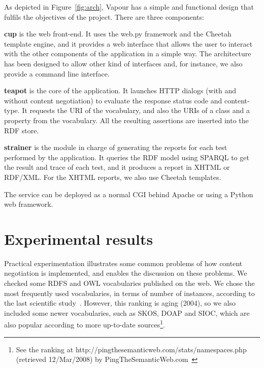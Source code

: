 \documentclass{../templates/llncs}
\begin{document}
As depicted in Figure~\ref{fig:arch}, Vapour has a simple and functional
design that fulfils the objectives of the project. There are three components:

\begin{description}

  \item \textbf{cup} is the web front-end. It uses the web.py framework
        and the Cheetah template engine, and it provides a web interface that allows 
        the user to interact with the other components of the application in a 
        simple way. The architecture has been designed to allow other kind 
        of interfaces and, for instance, we also provide a command line interface.

  \item \textbf{teapot} is the core of the application. It launches
        HTTP dialogs 
        (with and without content negotiation) to evaluate the response
        status code and content-type. It requests the URI of the vocabulary, and 
        also the URIs of a class and a property from the vocabulary. All the resulting assertions are 
        inserted into the RDF store.

  \item \textbf{strainer} is the module in charge of generating the reports for
        each test performed by the application. It queries the RDF model using SPARQL %
        to get the result and trace of each test, and it produces 
        a report in XHTML or RDF/XML. For the XHTML reports, we also use Cheetah 
        templates.

\end{description}

The service can be deployed as a normal CGI behind Apache or using a Python web 
framework. %

\section{\label{sec:experimental}Experimental results}

Practical experimentation illustrates some common problems of how
content negotiation is implemented, and enables the discussion on 
these problems. We checked some RDFS and OWL vocabularies published on the web.
We chose the most frequently used vocabularies, in terms of number of
instances, according to the last scientific study~\cite{Li2005}. However,
this ranking is aging (2004), so we also included some newer
vocabularies, such as SKOS, DOAP and SIOC, which are also popular
according to more up-to-date sources\footnote{See the ranking at http://pingthesemanticweb.com/stats/namespaces.php (retrieved 12/Mar/2008) by PingTheSemanticWeb.com~\cite{Bojars2007}}.
\end{document}
